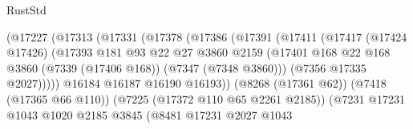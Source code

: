 \begin{lexlean}{RustStd}
\begin{coremodule}
                                          (@17227
                                            (@17313
                                              (@17331
                                                (@17378
                                                  (@17386
                                                    (@17391
                                                      (@17411
                                                        (@17417
                                                          (@17424 @17426)
                                                          (@17393
                                                            @181
                                                            @93
                                                            @22
                                                            @27
                                                            @3860
                                                            @2159
                                                            (@17401
                                                              @168
                                                              @22
                                                              @168
                                                              @3860
                                                              (@7339 (@17406 @168))
                                                              (@7347 (@7348 @3860)))
                                                            (@7356 @17335 @2027)))))
                                                    @16184
                                                    @16187
                                                    @16190
                                                    @16193))
                                                (@8268 (@17361 @62))
                                                (@7418 (@17365 @66 @110))
                                                (@7225 (@17372 @110 @65 @2261 @2185))
                                                (@7231
                                                  @17231
                                                  @1043
                                                  @1020
                                                  @2185
                                                  @3845
                                                  (@8481
                                                    @17231
                                                    @2027
                                                    @1043

\end{coremodule}
\end{lexlean}
